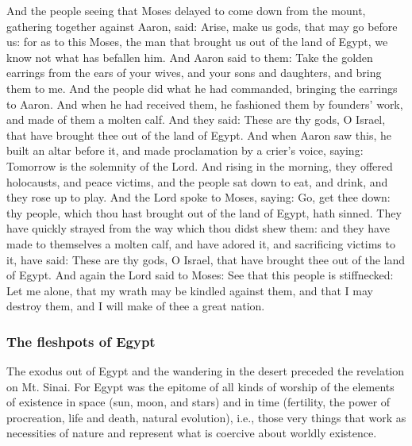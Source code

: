 \begin{multicols}{2}\small
And the people seeing that Moses delayed to come down from the mount, gathering together against Aaron, said: Arise,
make us gods, that may go before us: for as to this Moses, the man that brought us out of the land of Egypt, we know
not what has befallen him. And Aaron said to them: Take the golden earrings from the ears of your wives, and your sons
and daughters, and bring them to me. And the people did what he had commanded, bringing the earrings to Aaron. And when
he had received them, he fashioned them by founders' work, and made of them a molten calf. And
they said: These are thy gods, O Israel, that have brought thee out of the land of Egypt. And when Aaron saw this, he
built an altar before it, and made proclamation by a crier's voice, saying: Tomorrow is the
solemnity of the Lord. And rising in the morning, they offered holocausts, and peace victims, and the people sat down
to eat, and drink, and they rose up to play. And the Lord spoke to Moses, saying: Go, get thee down: thy people, which
thou hast brought out of the land of Egypt, hath sinned. They have quickly strayed from the way which thou didst shew
them: and they have made to themselves a molten calf, and have adored it, and sacrificing victims to it, have said:
These are thy gods, O Israel, that have brought thee out of the land of Egypt. And again the Lord said to Moses: See
that this people is stiffnecked: Let me alone, that my wrath may be kindled against them, and that I may destroy them,
and I will make of thee a great nation. 
\end{multicols}

\subsubsection*{The fleshpots of Egypt}

The exodus out of Egypt and the wandering in the desert preceded the revelation on Mt. Sinai. For Egypt was the epitome
of all kinds of worship of the elements of existence in space (sun, moon, and stars) and in time (fertility, the power
of procreation, life and death, natural evolution), i.e., those very things that work as necessities of nature and
represent what is coercive about worldly existence.


